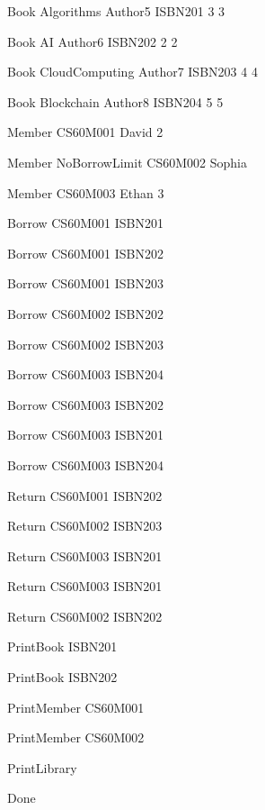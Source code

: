Book
Algorithms Author5 ISBN201 3 3

Book
AI Author6 ISBN202 2 2

Book
CloudComputing Author7 ISBN203 4 4

Book
Blockchain Author8 ISBN204 5 5

Member
CS60M001 David 2

Member
NoBorrowLimit CS60M002 Sophia

Member
CS60M003 Ethan 3

Borrow
CS60M001 ISBN201

Borrow
CS60M001 ISBN202

Borrow
CS60M001 ISBN203

Borrow
CS60M002 ISBN202

Borrow
CS60M002 ISBN203

Borrow
CS60M003 ISBN204

Borrow
CS60M003 ISBN202

Borrow
CS60M003 ISBN201

Borrow
CS60M003 ISBN204

Return
CS60M001 ISBN202

Return
CS60M002 ISBN203

Return
CS60M003 ISBN201

Return
CS60M003 ISBN201

Return
CS60M002 ISBN202

PrintBook
ISBN201

PrintBook
ISBN202

PrintMember
CS60M001

PrintMember
CS60M002

PrintLibrary

Done